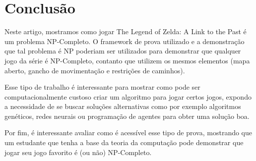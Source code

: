 \section{Conclusão}

Neste artigo, mostramos como jogar The Legend of Zelda: A Link to the Past é um
problema NP-Completo. O framework de prova utilizado e a demonstração que tal problema
é NP poderiam ser utilizados para demonstrar que qualquer jogo da série é NP-Completo, contanto
que utilizem os mesmos elementos (mapa aberto, gancho de movimentação e restrições de caminhos).

Esse tipo de trabalho é interessante para mostrar como pode ser computacionalmente custoso
criar um algoritmo para jogar certos jogos, expondo a necessidade de se buscar soluções
alternativas como por exemplo algoritmos genéticos, redes neurais ou programação de agentes para
obter uma solução boa.

Por fim, é interessante avaliar como é acessível esse tipo de prova, mostrando que um estudante
que tenha a base da teoria da computação pode demonstrar que jogar seu jogo favorito é (ou não) NP-Completo.